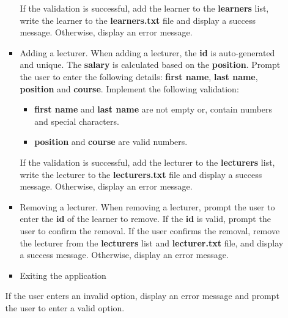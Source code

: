 \documentclass{article}
\begin{document}
\begin{itemize}
\begin{itemize}
\begin{itemize}
\begin{itemize}
            \end{itemize} 
            If the validation is successful, add the learner to the \textbf{learners} list, write the learner to the \textbf{learners.txt} file and display a success message. Otherwise, display an error message.                          
            \item Adding a lecturer. When adding a lecturer, the \textbf{id} is auto-generated and unique. The \textbf{salary} is calculated based on the \textbf{position}. Prompt the user to enter the following details: \textbf{first name}, \textbf{last name}, \textbf{position} and \textbf{course}. Implement the following validation:
            \begin{itemize}
                \item \textbf{first name} and \textbf{last name} are not empty or, contain numbers and special characters.
                \item \textbf{position} and \textbf{course} are valid numbers.
            \end{itemize}
            If the validation is successful, add the lecturer to the \textbf{lecturers} list, write the lecturer to the \textbf{lecturers.txt} file and display a success message. Otherwise, display an error message.
            \item Removing a lecturer. When removing a lecturer, prompt the user to enter the \textbf{id} of the learner to remove. If the \textbf{id} is valid, prompt the user to confirm the removal. If the user confirms the removal, remove the lecturer from the \textbf{lecturers} list and \textbf{lecturer.txt} file, and display a success message. Otherwise, display an error message.
            \item Exiting the application
        \end{itemize} 
        If the user enters an invalid option, display an error message and prompt the user to enter a valid option.
    \end{itemize}
\end{itemize}
\end{document}
